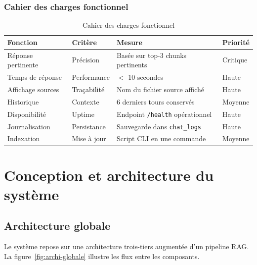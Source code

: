 \documentclass[12pt, a4paper, twoside]{report}
\begin{document}
\subsection{Cahier des charges fonctionnel}

\begin{table}[H]
\centering
\caption{Cahier des charges fonctionnel}
\label{tab:cdc}
\begin{tabularx}{\textwidth}{l l X l}
\toprule
\rowcolor{primary!10}
\textbf{Fonction} & \textbf{Critère} & \textbf{Mesure} & \textbf{Priorité} \\
\midrule
Réponse pertinente & Précision & Basée sur top-3 chunks pertinents & Critique \\
Temps de réponse & Performance & $<$ 10 secondes & Haute \\
Affichage sources & Traçabilité & Nom du fichier source affiché & Haute \\
Historique & Contexte & 6 derniers tours conservés & Moyenne \\
Disponibilité & Uptime & Endpoint \texttt{/health} opérationnel & Haute \\
Journalisation & Persistance & Sauvegarde dans \texttt{chat\_logs} & Haute \\
Indexation & Mise à jour & Script CLI en une commande & Moyenne \\
\bottomrule
\end{tabularx}
\end{table}

\cleardoublepage

\chapter{Conception et architecture du système}

\section{Architecture globale}

Le système repose sur une architecture trois-tiers augmentée d'un pipeline RAG. La figure~\ref{fig:archi-globale} illustre les flux entre les composants.
\end{document}
